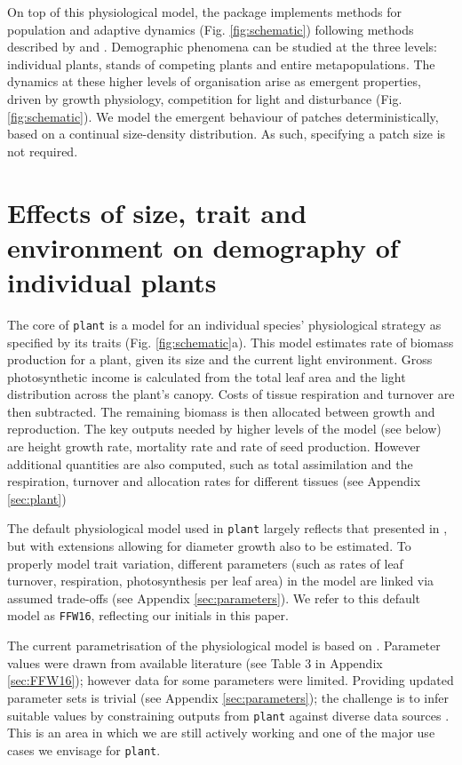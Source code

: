 \documentclass[a4paper,11pt]{article}
\newcommand{\plant}{\texttt{plant}}
\begin{document}
On top of this physiological model, the package implements methods for
population and adaptive dynamics (Fig.  \ref{fig:schematic}) following methods
described by \citet{Falster-2011} and \citet{Falster-2015}. Demographic
phenomena can be studied at the three levels: individual plants, stands of
competing plants and entire metapopulations. The dynamics at these higher
levels of organisation arise as emergent properties, driven by growth
physiology, competition for light and disturbance (Fig.  \ref{fig:schematic}).
We model the emergent behaviour of patches deterministically, based on a
continual  size-density distribution. As such, specifying a patch size
is not required.

\section{Effects of size, trait and environment on demography of individual plants}

The core of {\plant} is a model for an individual species'
physiological strategy as specified by its traits
(Fig. \ref{fig:schematic}a). This model estimates rate of biomass
production for a plant, given its size and the current light
environment. Gross photosynthetic income is calculated from the total
leaf area and the light distribution across the plant's canopy. Costs
of tissue respiration and turnover are then subtracted. The remaining
biomass is then allocated between growth and reproduction.  The key
outputs needed by higher levels of the model (see below) are height
growth rate, mortality rate and rate of seed production.  However
additional quantities are also computed, such as total assimilation
and the respiration, turnover and allocation rates for different
tissues (see Appendix \ref{sec:plant})

The default physiological model used in {\plant} largely reflects that
presented in \citet{Falster-2011,Falster-2015}, but with extensions
allowing for diameter growth also to be estimated. To properly model
trait variation, different parameters (such as rates of leaf turnover,
respiration, photosynthesis per leaf area) in the model are linked via
assumed trade-offs (see Appendix \ref{sec:parameters}).  We refer to
this default model as \texttt{FFW16}, reflecting our initials in this
paper.

The current parametrisation of the physiological model is based on
\citet{Falster-2011}. Parameter values were drawn from available
literature (see Table 3 in Appendix \ref{sec:FFW16}); however data for
some parameters were limited. Providing updated parameter sets is
trivial (see Appendix \ref{sec:parameters}); the challenge is to infer
suitable values by constraining outputs from {\plant} against diverse
data sources \citep{Lebauer-2012, Keenan-2013}. This is an area in
which we are still actively working and one of the major use cases we
envisage for {\plant}.
\end{document}
